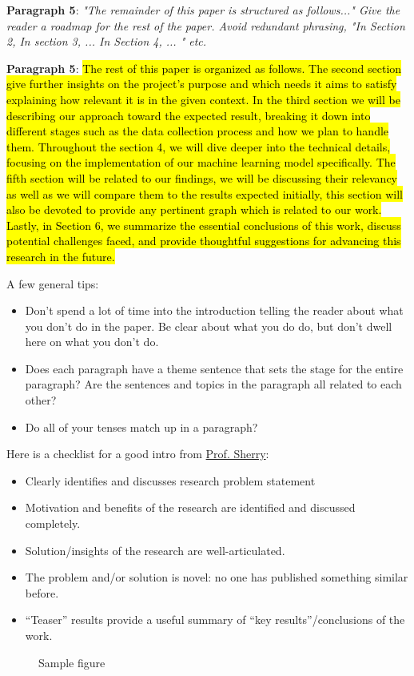 \textbf{Paragraph 5}: \textit{"The remainder of this paper is structured as follows..." Give the reader a roadmap for the rest of the paper. Avoid redundant phrasing, "In Section 2, In section 3, ... In Section 4, ... " etc.}

\textbf{Paragraph 5}: \hl{The rest of this paper is organized as follows. The second section give further insights on the project's purpose and which needs it aims to satisfy explaining how relevant it is in the given context. In the third section we will be describing our approach toward the expected result, breaking it down into different stages such as the data collection process and how we plan to handle them. Throughout the section 4, we will dive deeper into the technical details, focusing on the implementation of our machine learning model specifically. The fifth section will be related to our findings, we will be discussing their relevancy as well as we will compare them to the results expected initially, this section will also be devoted to provide any pertinent graph which is related to our work. Lastly, in Section 6, we summarize the essential conclusions of this work, discuss potential challenges faced, and provide thoughtful suggestions for advancing this research in the future.}

A few general tips:
\begin{itemize}
    \item Don't spend a lot of time into the introduction telling the reader about what you don't do in the paper. Be clear about what you do do, but don't dwell here on what you don't do.
    \item Does each paragraph have a theme sentence that sets the stage for the entire paragraph? Are the sentences and topics in the paragraph all related to each other?
    \item Do all of your tenses match up in a paragraph?
\end{itemize}


Here is a checklist for a good intro from \href{https://docs.google.com/document/d/14g-4txTMwJ4YL61qOcaH6bJWKh59PkI1S-FB1KjeMS4/edit}{Prof. Sherry}: 
\begin{itemize}
    \item Clearly identifies and discusses research problem statement
    \item Motivation and benefits of the research are identified and discussed completely.
    \item Solution/insights of the research are well-articulated.
    \item The problem and/or solution is novel: no one has published something similar before.
    \item ``Teaser'' results provide a useful summary of ``key results''/conclusions of the work.
\end{itemize}


\begin{figure}[t] 
\caption{{Sample figure~\cite{sonata}} \label{fig:dynamiq-nutshell}
}
\vspace{-.15in}
\end{figure}
